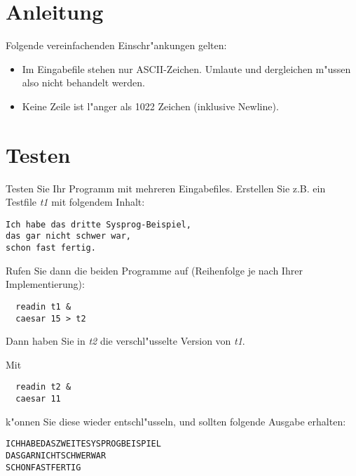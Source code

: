 \section*{Anleitung}
Folgende vereinfachenden Einschr"ankungen gelten:
\begin{itemize}
\item Im Eingabefile stehen nur ASCII-Zeichen. Umlaute und dergleichen
m"ussen also nicht behandelt werden.
\item Keine Zeile ist l"anger als 1022 Zeichen (inklusive Newline).
\end{itemize}




\section*{Testen}
Testen Sie Ihr Programm mit mehreren Eingabefiles. 
Erstellen Sie z.B. ein Testfile \emph{t1} mit folgendem Inhalt: 
\begin{verbatim}
Ich habe das dritte Sysprog-Beispiel,
das gar nicht schwer war,
schon fast fertig.
\end{verbatim}
Rufen Sie dann die beiden Programme auf (Reihenfolge je nach Ihrer
Implementierung):
\begin{verbatim}
  readin t1 &
  caesar 15 > t2
\end{verbatim}
Dann haben Sie in \emph{t2} die verschl"usselte Version von \emph{t1}.

Mit
\begin{verbatim}
  readin t2 &
  caesar 11
\end{verbatim}
k"onnen Sie diese wieder entschl"usseln, und sollten folgende Ausgabe
erhalten:
\begin{verbatim}
ICHHABEDASZWEITESYSPROGBEISPIEL
DASGARNICHTSCHWERWAR
SCHONFASTFERTIG
\end{verbatim}

\osueguidelinesthree


